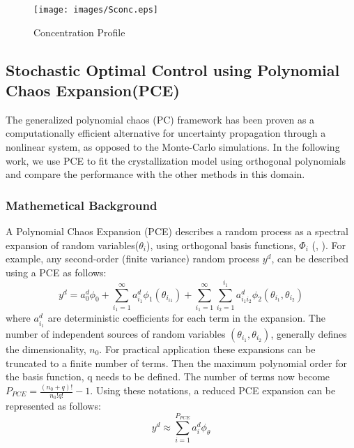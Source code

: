 \documentclass[3p,times,authoryear]{elsarticle}
\begin{document}
\begin{figure}[h!] 

\begin{center}
\texttt{[image: images/Sconc.eps]}
\end{center}
\caption{Concentration Profile}
\end{figure}


\subsection{Stochastic Optimal Control using Polynomial Chaos Expansion(PCE)}

The generalized polynomial chaos (PC) framework has been proven as a computationally efficient alternative for uncertainty propagation through a  nonlinear system, as opposed to the Monte-Carlo simulations. In the following work, we use PCE to fit the crystallization model using orthogonal polynomials and compare the performance with the other methods in this domain. 

\subsubsection{Mathemetical Background}
A Polynomial Chaos Expansion (PCE) describes a random process as a spectral expansion of random variables($\theta_{i}$), using orthogonal basis functions, $\Phi_{i}$ (\cite{ghanem}, \cite{ghanem1997}). For example, any second-order (finite variance) random process $y^{d}$, can be described using a PCE as follows:
\begin{equation}
y^{d} = a_{0}^{d}\phi_{0} + \sum_{i_{1}=1}^{\infty} a_{i_{1}}^{d}\phi_{1}(\theta_{i_{i1}}) + \sum_{i_{1}=1}^{\infty}\sum_{i_{2}=1}^{i_{1}} a_{i_{1}i_{2}}^d\phi_{2}(\theta_{i_{1}},\theta_{i_{2}})
\end{equation}
where $a_{i_{1}}^d$  are deterministic coefficients for each term in the expansion. The number of independent sources of random variables $(\theta_{i_{1}}, \theta_{i_{2}})$, generally defines the dimensionality, $n_{0}$. For practical application these expansions can be truncated to a finite number of terms. Then the maximum polynomial order for the basis function, q needs to be defined. The number of terms now become $P_{PCE} = \frac{(n_{0}+q)!}{n_{0}!q!} -1 $. Using these notations, a reduced PCE expansion can be represented as follows:
\begin{equation} 
\label{poly}
y^{d} \approx \sum_{i=1}^{P_{PCE}} a_{i}^{d}\phi_{\theta}
\end{equation}
\end{document}

